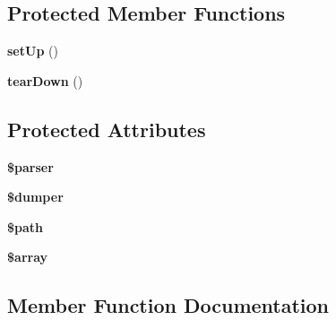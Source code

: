 \subsection*{Protected Member Functions}
\begin{DoxyCompactItemize}
\item 
{\bfseries set\+Up} ()\hypertarget{classSymfony_1_1Component_1_1Yaml_1_1Tests_1_1DumperTest_a8f1a964f7cbe1f3cc0e451be4517bb8b}{}\label{classSymfony_1_1Component_1_1Yaml_1_1Tests_1_1DumperTest_a8f1a964f7cbe1f3cc0e451be4517bb8b}

\item 
{\bfseries tear\+Down} ()\hypertarget{classSymfony_1_1Component_1_1Yaml_1_1Tests_1_1DumperTest_a06b1844c8bd6a1b12111fb860d9f0291}{}\label{classSymfony_1_1Component_1_1Yaml_1_1Tests_1_1DumperTest_a06b1844c8bd6a1b12111fb860d9f0291}

\end{DoxyCompactItemize}
\subsection*{Protected Attributes}
\begin{DoxyCompactItemize}
\item 
{\bfseries \$parser}\hypertarget{classSymfony_1_1Component_1_1Yaml_1_1Tests_1_1DumperTest_a8dc54b5d6f7606e9ca099052a88bda19}{}\label{classSymfony_1_1Component_1_1Yaml_1_1Tests_1_1DumperTest_a8dc54b5d6f7606e9ca099052a88bda19}

\item 
{\bfseries \$dumper}\hypertarget{classSymfony_1_1Component_1_1Yaml_1_1Tests_1_1DumperTest_aefd001ec69cb0fbdb0f1e4ccfc768444}{}\label{classSymfony_1_1Component_1_1Yaml_1_1Tests_1_1DumperTest_aefd001ec69cb0fbdb0f1e4ccfc768444}

\item 
{\bfseries \$path}\hypertarget{classSymfony_1_1Component_1_1Yaml_1_1Tests_1_1DumperTest_a28bdc8e7e8247d5120f05bb38056901a}{}\label{classSymfony_1_1Component_1_1Yaml_1_1Tests_1_1DumperTest_a28bdc8e7e8247d5120f05bb38056901a}

\item 
{\bfseries \$array}
\end{DoxyCompactItemize}


\subsection{Member Function Documentation}
